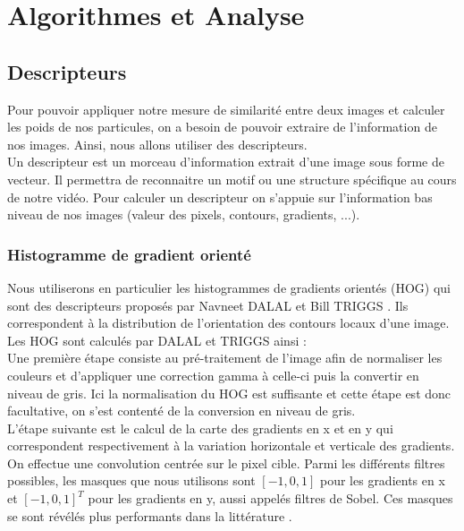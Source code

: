 \pagestyle{plain}
\chapter{Algorithmes et Analyse}




\section{Descripteurs}
Pour pouvoir appliquer notre mesure de similarité entre deux images et calculer les poids de nos particules, on a besoin de pouvoir extraire de l'information de nos images. Ainsi, nous allons utiliser des descripteurs. \\
Un descripteur est un morceau d'information extrait d'une image sous forme de vecteur. Il permettra de reconnaitre un motif ou une structure spécifique au cours de notre vidéo. Pour calculer un descripteur on s'appuie sur l'information bas niveau de nos images (valeur des pixels, contours, gradients, ...).

\subsection{Histogramme de gradient orienté}

Nous utiliserons en particulier les histogrammes de gradients orientés (HOG) qui sont des descripteurs proposés par Navneet DALAL et Bill TRIGGS \cite{dalal_histograms_2005}. Ils correspondent à la distribution de l'orientation des contours locaux d'une image. \\

Les HOG sont calculés par DALAL et TRIGGS ainsi : \\

Une première étape consiste au pré-traitement de l'image afin de normaliser les couleurs et d'appliquer une correction gamma à celle-ci puis la convertir en niveau de gris. Ici la normalisation du HOG est suffisante et cette étape est donc facultative, on s'est contenté de la conversion en niveau de gris. \\

L'étape suivante est le calcul de la carte des gradients en x et en y qui correspondent respectivement à la variation horizontale et verticale des gradients. On effectue une convolution centrée sur le pixel cible. Parmi les différents filtres possibles, les masques que nous utilisons sont $[-1, 0, 1]$ pour les gradients en x et $[-1, 0, 1]^{T}$ pour les gradients en y, aussi appelés filtres de Sobel. Ces masques se sont révélés plus performants dans la littérature \cite{dalal_histograms_2005}.\\

